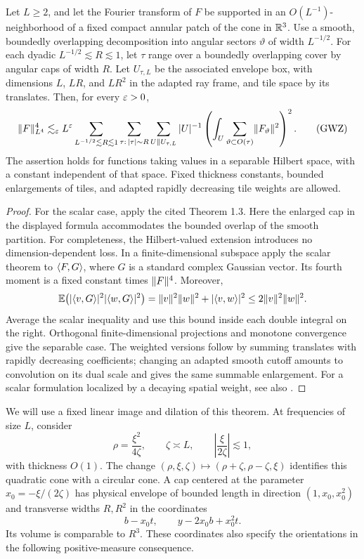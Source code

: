 \begin{theorem}
\label{low:gwz}
Let $L\geq 2$, and let the Fourier transform of $F$ be supported in an
$O(L^{-1})$-neighborhood of a fixed compact annular patch of the cone in
$\mathbb R^3$. Use a smooth, boundedly overlapping decomposition into angular
sectors $\vartheta$ of width $L^{-1/2}$. For each dyadic
$L^{-1/2}\lesssim R\lesssim 1$, let $\tau$ range over a boundedly
overlapping cover by angular caps of width $R$. Let $U_{\tau,L}$ be the
associated envelope box, with dimensions $L$, $LR$, and $LR^2$ in the
adapted ray frame, and tile space by its translates. Then, for every
$\varepsilon>0$,
\begin{equation}
 \lVert F\rVert_{L^4}^4
 \lesssim_{\varepsilon} L^{\varepsilon}
 \sum_{L^{-1/2}\lesssim R\lesssim 1}
 \sum_{\tau:\,|\tau|\sim R}
 \sum_{U\parallel U_{\tau,L}} |U|^{-1}
 \left(\int_U\sum_{\vartheta\subset O(\tau)}
                    \lVert F_\vartheta\rVert^2\right)^2.
 \tag{GWZ}\label{eq:GWZ}
\end{equation}
The assertion holds for functions taking values in a separable Hilbert
space, with a constant independent of that space. Fixed thickness
constants, bounded enlargements of tiles, and adapted rapidly decreasing
tile weights are allowed.
\end{theorem}

\begin{proof}
For the scalar case, apply the cited Theorem 1.3.
Here the enlarged cap in the displayed formula accommodates the bounded
overlap of the smooth partition. For completeness, the Hilbert-valued
extension introduces no dimension-dependent loss. In a finite-dimensional
subspace apply the scalar theorem to $\langle F,G\rangle$, where $G$ is a standard
complex Gaussian vector. Its fourth moment is a fixed constant times
$\lVert F\rVert^4$. Moreover,
\[
 \mathbb E\bigl(|\langle v,G\rangle|^2|\langle w,G\rangle|^2\bigr)
 =\lVert v\rVert^2\lVert w\rVert^2+|\langle v,w\rangle|^2
 \leq 2\lVert v\rVert^2\lVert w\rVert^2.
\]
Average the scalar inequality and use this bound inside each double
integral on the right. Orthogonal finite-dimensional projections and
monotone convergence give the separable case. The weighted versions
follow by summing translates with rapidly decreasing coefficients;
changing an adapted smooth cutoff amounts to convolution on its dual
scale and gives the same summable enlargement.
For a scalar formulation localized by a decaying spatial weight, see also
\cite[Theorem~1.5]{GuthWangZhang2020}.
\end{proof}

We will use a fixed linear image and dilation of this theorem. At
frequencies of size $L$, consider
\[
 \rho=\frac{\xi^2}{4\zeta},\qquad \zeta\asymp L,
 \qquad \left|\frac{\xi}{2\zeta}\right|\lesssim 1,
\]
with thickness $O(1)$. The change
$(\rho,\xi,\zeta)\mapsto(\rho+\zeta,\rho-\zeta,\xi)$ identifies this
quadratic cone with a circular cone. A cap centered at the parameter
$x_0=-\xi/(2\zeta)$ has physical envelope of bounded length in direction
$(1,x_0,x_0^2)$ and transverse widths $R,R^2$ in the coordinates
\[
 b-x_0t,\qquad y-2x_0b+x_0^2t.
\]
Its volume is comparable to $R^3$. These coordinates also specify the
orientations in the following positive-measure consequence.

